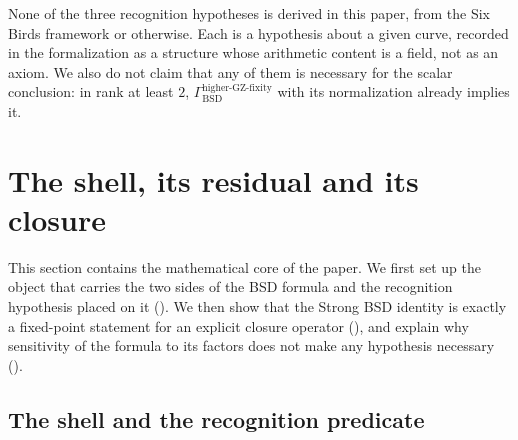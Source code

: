 \documentclass[11pt]{article}
\theoremstyle{definition}
\newcommand{\GammaGZ}{\Gamma_{\mathrm{BSD}}^{\mathrm{higher\text{-}GZ\text{-}fixity}}}
\begin{document}
\begin{nonclaim}\label{nonclaim:closure:recognition-sources-not-derived}
None of the three recognition hypotheses is derived in this paper, from
the Six Birds framework or otherwise.  Each is a hypothesis about a given
curve, recorded in the formalization as a structure whose arithmetic
content is a field, not as an axiom.  We also do not claim that any of
them is necessary for the scalar conclusion: in rank at least $2$,
$\GammaGZ$ with its normalization already implies it.
\end{nonclaim}
 \section{The shell, its residual and its closure}
\label{sec:shell-readout}

This section contains the mathematical core of the paper.  We first set
up the object that carries the two sides of the BSD formula and the
recognition hypothesis placed on it ().
We then show that the Strong BSD identity is exactly a fixed-point
statement for an explicit closure operator (),
and explain why sensitivity of the formula to its factors does not make
any hypothesis necessary ().

\subsection{The shell and the recognition predicate}
\label{sec:shell-readout-basic}
\end{document}
